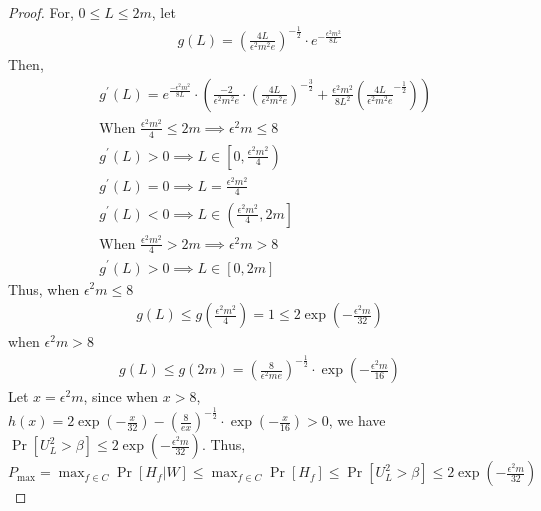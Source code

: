 \begin{proof}
    For, $0\le L \le 2m$, let 
    \begin{align}
        \nonumber g(L)=\left( \frac{4L}{\epsilon^2m^2e} \right)^{-\frac{1}{2}}\cdot e^{-\frac{\epsilon^2m^2}{8L}}
    \end{align}
    Then,
    \begin{align}
        \nonumber &g^{\prime}(L)=e^{\frac{-\epsilon^2m^2}{8L}}\cdot\left( \frac{-2}{\epsilon^2m^2e}\cdot \left(\frac{4L}{\epsilon^2m^2e}\right)^{-\frac{3}{2}} +\frac{\epsilon^2m^2}{8L^2}\left(\frac{4L}{\epsilon^2m^2e}^{-\frac{1}{2}}\right) \right)\\
        \nonumber &\text{When~} \frac{\epsilon^2m^2}{4}\le 2m \implies \epsilon^2m\le 8 \\
        \nonumber &g^{\prime}(L)>0 \implies L\in\left[0, \frac{\epsilon^2m^2}{4}\right)\\
        \nonumber &g^{\prime}(L)=0 \implies L=\frac{\epsilon^2m^2}{4}\\    
        \nonumber &g^{\prime}(L)<0 \implies L\in\left( \frac{\epsilon^2m^2}{4},2m\right] \\
        \nonumber &\text{When~} \frac{\epsilon^2m^2}{4}> 2m \implies \epsilon^2m> 8 \\
        \nonumber &g^{\prime}(L)>0 \implies L\in\left[0, 2m\right]
    \end{align}
    Thus, when $\epsilon^2m\le 8$
    \begin{align}
        \nonumber g(L)\le g\left(\frac{\epsilon^2m^2}{4}\right)= 1 \le 2\exp\left( -\frac{\epsilon ^2m}{32} \right)
    \end{align}
    when $\epsilon^2m> 8$
    \begin{align}
        \nonumber g(L)\le g\left(2m\right)= \left( \frac{8}{\epsilon^2me} \right)^{-\frac{1}{2}}\cdot \exp\left( -\frac{\epsilon ^2m}{16} \right)
    \end{align}
    Let $x=\epsilon^2m$, since when $x>8$, $h(x)=2\exp\left( -\frac{x}{32} \right)- \left( \frac{8}{ex} \right)^{-\frac{1}{2}}\cdot \exp\left( -\frac{x}{16} \right)> 0$, we have $\Pr[U_L^2>\beta]\le 2\exp\left( -\frac{\epsilon^2m}{32} \right)$.
    Thus, $P_{\max}=\max_{f\in C}\Pr[H_f|W]\le \max_{f\in C}\Pr[H_f]\le \Pr[U_L^2>\beta]\le 2\exp\left( -\frac{\epsilon^2m}{32} \right)$
\end{proof}
